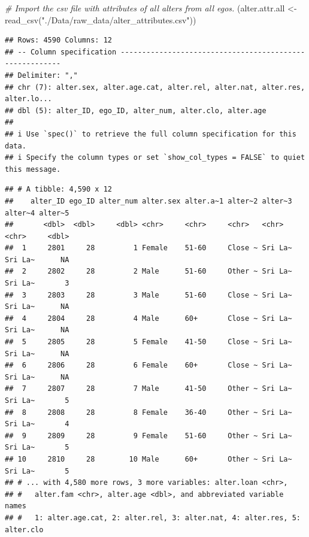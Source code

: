\documentclass[
]{book}
\newenvironment{Shaded}{\begin{snugshade}}{\end{snugshade}}
\newcommand{\AttributeTok}[1]{\textcolor[rgb]{0.77,0.63,0.00}{#1}}
\newcommand{\CommentTok}[1]{\textcolor[rgb]{0.56,0.35,0.01}{\textit{#1}}}
\newcommand{\FunctionTok}[1]{\textcolor[rgb]{0.00,0.00,0.00}{#1}}
\newcommand{\NormalTok}[1]{#1}
\newcommand{\OtherTok}[1]{\textcolor[rgb]{0.56,0.35,0.01}{#1}}
\newcommand{\SpecialCharTok}[1]{\textcolor[rgb]{0.00,0.00,0.00}{#1}}
\newcommand{\StringTok}[1]{\textcolor[rgb]{0.31,0.60,0.02}{#1}}
\begin{document}
\begin{Shaded}
\begin{Highlighting}[]
\CommentTok{\# Import the csv file with attributes of all alters from all egos.}
\NormalTok{(alter.attr.all }\OtherTok{\textless{}{-}} \FunctionTok{read\_csv}\NormalTok{(}\StringTok{"./Data/raw\_data/alter\_attributes.csv"}\NormalTok{))}
\end{Highlighting}
\end{Shaded}

\begin{verbatim}
## Rows: 4590 Columns: 12
## -- Column specification --------------------------------------------------------
## Delimiter: ","
## chr (7): alter.sex, alter.age.cat, alter.rel, alter.nat, alter.res, alter.lo...
## dbl (5): alter_ID, ego_ID, alter_num, alter.clo, alter.age
## 
## i Use `spec()` to retrieve the full column specification for this data.
## i Specify the column types or set `show_col_types = FALSE` to quiet this message.
\end{verbatim}

\begin{verbatim}
## # A tibble: 4,590 x 12
##    alter_ID ego_ID alter_num alter.sex alter.a~1 alter~2 alter~3 alter~4 alter~5
##       <dbl>  <dbl>     <dbl> <chr>     <chr>     <chr>   <chr>   <chr>     <dbl>
##  1     2801     28         1 Female    51-60     Close ~ Sri La~ Sri La~      NA
##  2     2802     28         2 Male      51-60     Other ~ Sri La~ Sri La~       3
##  3     2803     28         3 Male      51-60     Close ~ Sri La~ Sri La~      NA
##  4     2804     28         4 Male      60+       Close ~ Sri La~ Sri La~      NA
##  5     2805     28         5 Female    41-50     Close ~ Sri La~ Sri La~      NA
##  6     2806     28         6 Female    60+       Close ~ Sri La~ Sri La~      NA
##  7     2807     28         7 Male      41-50     Other ~ Sri La~ Sri La~       5
##  8     2808     28         8 Female    36-40     Other ~ Sri La~ Sri La~       4
##  9     2809     28         9 Female    51-60     Other ~ Sri La~ Sri La~       5
## 10     2810     28        10 Male      60+       Other ~ Sri La~ Sri La~       5
## # ... with 4,580 more rows, 3 more variables: alter.loan <chr>,
## #   alter.fam <chr>, alter.age <dbl>, and abbreviated variable names
## #   1: alter.age.cat, 2: alter.rel, 3: alter.nat, 4: alter.res, 5: alter.clo
\end{verbatim}

\begin{Shaded}
\end{Shaded}
\end{document}
